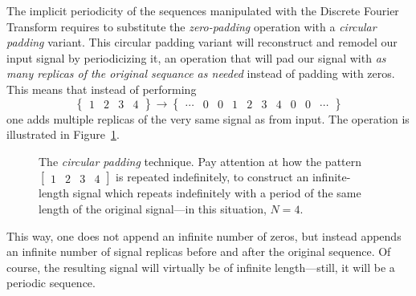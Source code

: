 \documentclass[\documentfontsize, twocolumn]{\classname}
\begin{document}
The implicit periodicity of the sequences manipulated with the Discrete Fourier Transform requires to substitute the \emph{zero-padding} operation with a \emph{circular padding} variant. This circular padding variant will reconstruct and remodel our input signal by periodicizing it, an operation that will pad our signal with \emph{as many replicas of the original sequance as needed} instead of padding with zeros. This means that instead of performing
\[
    \begin{Bmatrix} 1 & 2 & 3 & 4 \end{Bmatrix} \rightarrow \begin{Bmatrix} \cdots & 0 & 0 & 1 & 2 & 3 & 4 & 0 & 0 & \cdots\end{Bmatrix}
\]
one adds multiple replicas of the very same signal as from input. The operation is illustrated in Figure~\ref{tikz:circularZeroPadding}.

\begin{figure}[ht]
\begin{center}
    \end{center}\caption{The \emph{circular padding} technique. Pay attention at how the pattern $\begin{bmatrix} 1 & 2 & 3 & 4 \end{bmatrix}$ is repeated indefinitely, to construct an infinite-length signal which repeats indefinitely with a period of the same length of the original signal---in this situation, $N=4$.}\label{tikz:circularZeroPadding}
\end{figure}

This way, one does not append an infinite number of zeros, but instead appends an infinite number of signal replicas before and after the original sequence. Of course, the resulting signal will virtually be of infinite length---still, it will be a periodic sequence.
\end{document}
